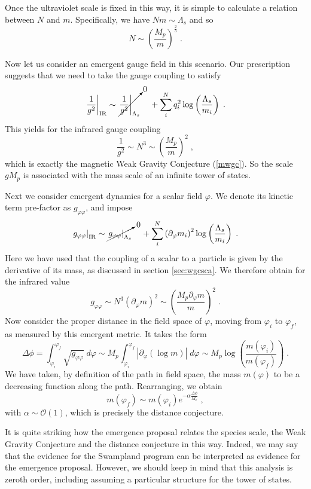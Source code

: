 \documentclass[11pt,a4paper]{article}
\numberwithin{equation}{section}
\numberwithin{table}{section}\setlength{\multlinegap}{25pt}
\newcommand{\cO}{\mathcal{O}}
\newcommand{\be}{\begin{equation}}
\newcommand{\ee}{\end{equation}}
\begin{document}
{Once the ultraviolet scale is fixed in this way, it is simple to calculate a relation between $N$ and $m$. Specifically, we have $N m \sim \Lambda_s$ and so
\be
N \sim \left(\frac{M_p}{m} \right)^{\frac23} \;.
\label{Nmrel}
\ee

Now let us consider an emergent gauge field in this scenario. Our prescription suggests that we need to take the gauge coupling to satisfy 
\be
\left.\frac{1}{g^2} \right|_{\mathrm{IR}}  \sim \cancelto{0}{\left. \frac{1}{g^2} \right|_{\Lambda_s}} \;\;\;\; + \sum_i^N q_i^2 \log \left( \frac{\Lambda_s}{m_i} \right) \;.
\ee
This yields for the infrared gauge coupling
\be
\frac{1}{g^2} \sim N^3 \sim \left(\frac{M_p}{m} \right)^{2} \;,
\ee
which is exactly the magnetic Weak Gravity Conjecture (\ref{mwgc}). So the scale $g M_p$ is associated with the mass scale of an infinite tower of states.

Next we consider emergent dynamics for a scalar field $\varphi$. We denote its kinetic term pre-factor as $g_{\varphi\varphi}$, and impose
\be
\left.g_{\varphi\varphi}\right|_{\mathrm{IR}}  \sim \cancelto{0}{\left.g_{\varphi\varphi}\right|_{\Lambda_s}} \;\;\;\; + \sum_i^N \left(\partial_{\varphi} m_i \right)^2 \log \left( \frac{\Lambda_s}{m_i} \right) \;.
\ee
Here we have used that the coupling of a scalar to a particle is given by the derivative of its mass, as discussed in section \ref{sec:wgcsca}. We therefore obtain for the infrared value
\be
g_{\varphi\varphi} \sim N^3 \left( \partial_{\varphi} m\right)^2 \sim \left(  \frac{M_p\partial_{\varphi} m}{m} \right)^2 \;.
\ee
Now consider the proper distance in the field space of $\varphi$, moving from $\varphi_i$ to $\varphi_f$, as measured by this emergent metric. It takes the form
\be
\Delta \phi = \int^{\varphi_f}_{\varphi_i}\sqrt{g_{\varphi\varphi} } \;d \varphi \sim M_p \int^{\varphi_f}_{\varphi_i} \left|\partial_{\varphi} \left( \log m \right) \right|\;d \varphi \sim M_p \log \left( \frac{m\left(\varphi_i\right)}{m\left(\varphi_f\right)} \right) \;.
\ee
We have taken, by definition of the path in field space, the mass $m\left(\varphi\right)$ to be a decreasing function along the path. Rearranging, we obtain
\be
m\left(\varphi_f\right) \sim m\left(\varphi_i\right) e^{- \alpha \frac{\Delta \phi}{M_p}} \;,
\ee
with $\alpha \sim \cO\left( 1\right)$, which is precisely the distance conjecture.

It is quite striking how the emergence proposal relates the species scale, the Weak Gravity Conjecture and the distance conjecture in this way. Indeed, we may say that the evidence for the Swampland program can be interpreted as evidence for the emergence proposal. However, we should keep in mind that this analysis is zeroth order, including assuming a particular structure for the tower of states.

}
\end{document}
